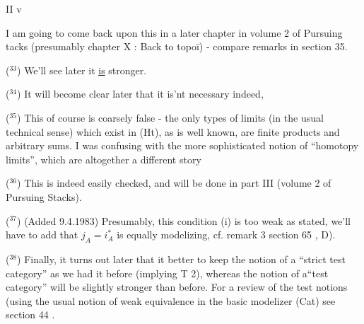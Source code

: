 II v

I am going to come back upon this in a later chapter in volume 2 of
Pursuing tacks (presumably chapter X : Back to topoï) - compare remarks
in section 35.

($^{33}$) We'll see later it \uline{is} stronger.

($^{34}$) It will become clear later  that it is'nt necessary indeed,  

(\hand{!}$^{35}$) This of course is  coarsely false - the only types of 
limits (in the usual technical sense) which exist in (Ht), as is well
known, are finite products and arbitrary sums. I was confusing with the
more sophisticated notion of ``homotopy limits'', which are altogether a
different story\hand{!}

($^{36}$) This is indeed easily checked, and will be done in part III
(volume 2 of Pursuing Stacks).

($^{37}$) (Added 9.4.1983) Presumably, this condition (i) is too weak as
stated, we'll have to add that $j_A=i_A^{*}$ is equally modelizing, cf. remark
3   section 65 , D).

($^{38}$) Finally, it turns out later  that it   better to keep the notion
of a ``strict test category'' as we had it before (implying T 2), whereas
the notion of a``test category'' will be  slightly stronger than
before. For a  review of the test notions (using the usual notion of weak
equivalence in the basic modelizer (Cat)\hand{),} see section 44 .


